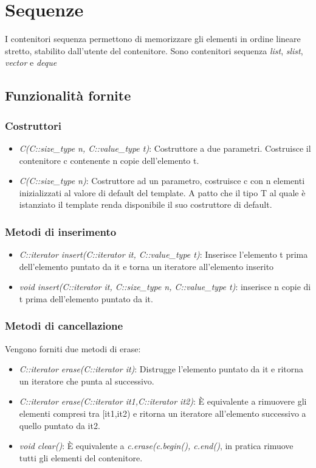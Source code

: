 \section{Sequenze}
I contenitori sequenza permettono di memorizzare gli elementi in ordine lineare stretto, stabilito dall'utente del contenitore. Sono contenitori sequenza \textit{list}, \textit{slist}, \textit{vector} e \textit{deque}

\subsection{Funzionalità fornite}

\subsubsection{Costruttori}

\begin{itemize}
	\item \textit{C(C::size\_type n, C::value\_type t)}: Costruttore a due parametri. Costruisce il contenitore c contenente n copie dell'elemento t.
	\item \textit{C(C::size\_type n)}: Costruttore ad un parametro, costruisce c con n elementi inizializzati al valore di default del template. A patto che il tipo T al quale è istanziato il template renda disponibile il suo costruttore di default.
\end{itemize}

\subsubsection{Metodi di inserimento}

\begin{itemize}
	\item \textit{C::iterator insert(C::iterator it, C::value\_type t)}: Inserisce l'elemento t prima dell'elemento puntato da it e torna un iteratore all'elemento inserito
	\item \textit{void insert(C::iterator it, C::size\_type n, C::value\_type t)}: inserisce n copie di t prima dell'elemento puntato da it.
\end{itemize}

\subsubsection{Metodi di cancellazione}
Vengono forniti due metodi di erase:

\begin{itemize}
	\item \textit{C::iterator erase(C::iterator it)}: Distrugge l'elemento puntato da it e ritorna un iteratore che punta al successivo.
	\item \textit{C::iterator erase(C::iterator it1,C::iterator it2)}: \`{E} equivalente a rimuovere gli elementi compresi tra [it1,it2) e ritorna un iteratore all'elemento successivo a quello puntato da it2.
	\item \textit{void clear()}: \`{E} equivalente a \textit{c.erase(c.begin(), c.end()}, in pratica rimuove tutti gli elementi del contenitore.
\end{itemize}

